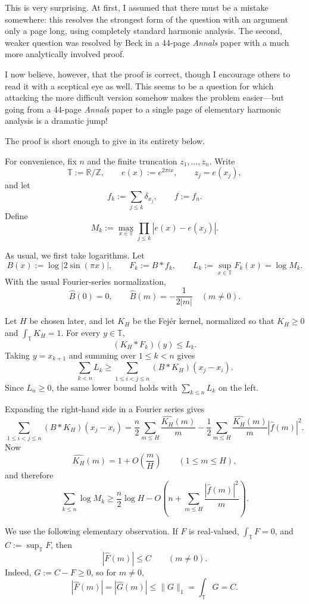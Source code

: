 \documentclass[11pt]{article}
\newcommand{\T}{\mathbb{T}}
\begin{document}
\onehalfspacing

This is very surprising. At first, I assumed that there must be a mistake
somewhere: this resolves the strongest form of the question with an argument
only a page long, using completely standard harmonic analysis. The second,
weaker question was resolved by Beck in a 44-page \emph{Annals} paper with a
much more analytically involved proof.

I now believe, however, that the proof is correct, though I encourage others
to read it with a sceptical eye as well. This seems to be a question for which
attacking the more difficult version somehow makes the problem easier---but
going from a 44-page \emph{Annals} paper to a single page of elementary
harmonic analysis is a dramatic jump!

The proof is short enough to give in its entirety below.

For convenience, fix $n$ and the finite truncation $z_1,\ldots,z_n$. Write
\[
  \T:=\mathbb{R}/\mathbb{Z},
  \qquad
  e(x):=e^{2\pi i x},
  \qquad
  z_j=e(x_j),
\]
and let
\[
  f_k:=\sum_{j\leq k}\delta_{x_j},
  \qquad
  f:=f_n.
\]
Define
\[
  M_k:=\max_{x\in\T}\prod_{j\leq k}|e(x)-e(x_j)|.
\]

As usual, we first take logarithms. Let
\[
  B(x):=\log|2\sin(\pi x)|,
  \qquad
  F_k:=B*f_k,
  \qquad
  L_k:=\sup_{x\in\T}F_k(x)=\log M_k.
\]
With the usual Fourier-series normalization,
\[
  \widehat{B}(0)=0,
  \qquad
  \widehat{B}(m)=-\frac{1}{2|m|}
  \quad (m\neq 0).
\]

Let $H$ be chosen later, and let $K_H$ be the Fej\'er kernel, normalized so
that $K_H\geq 0$ and $\int_{\T}K_H=1$. For every $y\in\T$,
\[
  (K_H*F_k)(y)\leq L_k.
\]
Taking $y=x_{k+1}$ and summing over $1\leq k<n$ gives
\[
  \sum_{k<n}L_k
  \geq
  \sum_{1\leq i<j\leq n}(B*K_H)(x_j-x_i).
\]
Since $L_n\geq 0$, the same lower bound holds with
$\sum_{k\leq n}L_k$ on the left.

Expanding the right-hand side in a Fourier series gives
\[
  \sum_{1\leq i<j\leq n}(B*K_H)(x_j-x_i)
  =
  \frac{n}{2}\sum_{m\leq H}\frac{\widehat{K_H}(m)}{m}
  -
  \frac{1}{2}\sum_{m\leq H}
  \frac{\widehat{K_H}(m)}{m}|\widehat{f}(m)|^2.
\]
Now
\[
  \widehat{K_H}(m)=1+O\left(\frac{m}{H}\right)
  \qquad (1\leq m\leq H),
\]
and therefore
\[
  \sum_{k\leq n}\log M_k
  \geq
  \frac{n}{2}\log H
  -
  O\left(
    n+\sum_{m\leq H}\frac{|\widehat{f}(m)|^2}{m}
  \right).
\]

We use the following elementary observation. If $F$ is real-valued,
$\int_{\T}F=0$, and $C:=\sup_{\T}F$, then
\[
  |\widehat{F}(m)|\leq C
  \qquad (m\neq 0).
\]
Indeed, $G:=C-F\geq 0$, so for $m\neq 0$,
\[
  |\widehat{F}(m)|
  =
  |\widehat{G}(m)|
  \leq
  \|G\|_1
  =
  \int_{\T}G
  =
  C.
\]
\end{document}
